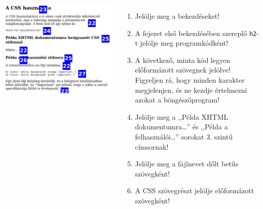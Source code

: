 \begin{frame}
  \begin{columns}[c]
      \begin{exampleblock}{}
        \includegraphics[width=\textwidth]{css4.pdf}
      \end{exampleblock}
      \begin{enumerate}
        \setcounter{enumi}{\thefeladatSzamlalo}
        \item Jelölje meg a bekezdéseket!
        \item A fejezet első bekezdésében szereplő \texttt{h2}-t jelölje meg programkódként!
        \item A következő, minta kód legyen előformázott szövegnek jelölve! Figyeljen rá, hogy minden karakter megjelenjen, és ne kezdje értelmezni azokat a böngészőprogram!
        \item Jelölje meg a ,,Példa XHTML dokumentumra\dots'' és ,,Példa a felhasználói\dots'' sorokat 3. szintű címsornak!
        \item Jelölje meg a fájlnevet dőlt betűs szövegként!
        \item A CSS szövegrészt jelölje előformázott szövegként!
        \setcounter{feladatSzamlalo}{\theenumi}
      \end{enumerate}
  \end{columns}
\end{frame}

